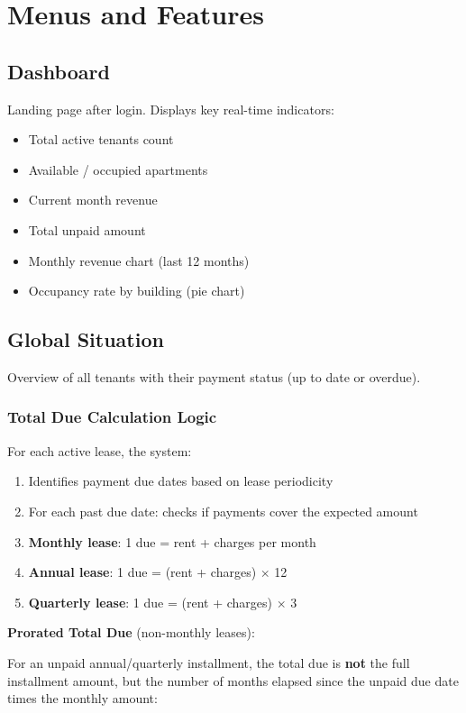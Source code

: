 \documentclass[a4paper,11pt]{article}
\begin{document}
\section{Menus and Features}

\subsection{Dashboard}

Landing page after login. Displays key real-time indicators:
\begin{itemize}
  \item Total active tenants count
  \item Available / occupied apartments
  \item Current month revenue
  \item Total unpaid amount
  \item Monthly revenue chart (last 12 months)
  \item Occupancy rate by building (pie chart)
\end{itemize}

\subsection{Global Situation}

Overview of all tenants with their payment status (up to date or overdue).

\subsubsection{Total Due Calculation Logic}

For each active lease, the system:
\begin{enumerate}
  \item Identifies payment due dates based on lease periodicity
  \item For each past due date: checks if payments cover the expected amount
  \item \textbf{Monthly lease}: 1 due = rent + charges per month
  \item \textbf{Annual lease}: 1 due = (rent + charges) $\times$ 12
  \item \textbf{Quarterly lease}: 1 due = (rent + charges) $\times$ 3
\end{enumerate}

\textbf{Prorated Total Due} (non-monthly leases):

For an unpaid annual/quarterly installment, the total due is \textbf{not} the full installment amount, but the number of months elapsed since the unpaid due date times the monthly amount:
\end{document}
